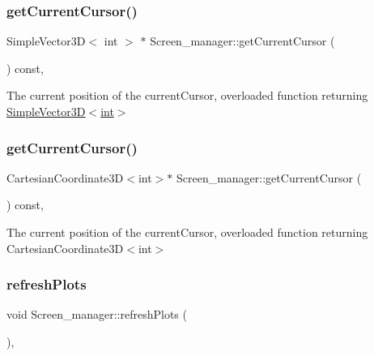 \subsubsection{\texorpdfstring{get\+Current\+Cursor()}{getCurrentCursor()}\hspace{0.1cm}{\footnotesize\ttfamily [1/2]}}
{\footnotesize\ttfamily Simple\+Vector3D$<$ int $>$ $\ast$ Screen\+\_\+manager\+::get\+Current\+Cursor (\begin{DoxyParamCaption}{ }\end{DoxyParamCaption}) const\hspace{0.3cm}{\ttfamily [inline]}, {\ttfamily [inherited]}}

The current position of the current\+Cursor, overloaded function returning \mbox{\hyperlink{classViewer_1_1SimpleVector3D}{Simple\+Vector3\+D$<$int$>$}} \mbox{\label{classScreen__manager_a9cb3da1f84299ee2c32e4032e7e19ed1}} 
\subsubsection{\texorpdfstring{get\+Current\+Cursor()}{getCurrentCursor()}\hspace{0.1cm}{\footnotesize\ttfamily [2/2]}}
{\footnotesize\ttfamily Cartesian\+Coordinate3D$<$int$>$$\ast$ Screen\+\_\+manager\+::get\+Current\+Cursor (\begin{DoxyParamCaption}{ }\end{DoxyParamCaption}) const\hspace{0.3cm}{\ttfamily [inline]}, {\ttfamily [inherited]}}

The current position of the current\+Cursor, overloaded function returning Cartesian\+Coordinate3\+D$<$int$>$ \mbox{\label{classScreen__manager_a846061886a15cdc0de881976564b02f2}} 
\subsubsection{\texorpdfstring{refresh\+Plots}{refreshPlots}}
{\footnotesize\ttfamily void Screen\+\_\+manager\+::refresh\+Plots (\begin{DoxyParamCaption}{ }\end{DoxyParamCaption})\hspace{0.3cm}{\ttfamily [slot]}, {\ttfamily [inherited]}}

